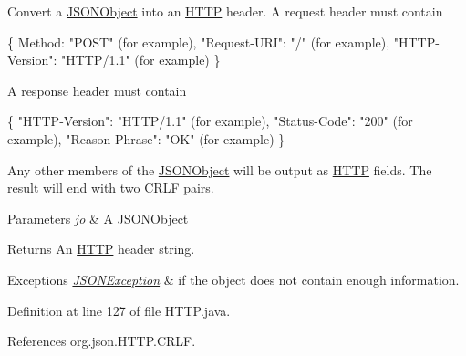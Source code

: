 Convert a \hyperlink{classorg_1_1json_1_1_j_s_o_n_object}{J\-S\-O\-N\-Object} into an \hyperlink{classorg_1_1json_1_1_h_t_t_p}{H\-T\-T\-P} header. A request header must contain 
\begin{DoxyPre}\{
   Method: "POST" (for example),
   "Request-URI": "/" (for example),
   "HTTP-Version": "HTTP/1.1" (for example)
\}\end{DoxyPre}
 A response header must contain 
\begin{DoxyPre}\{
   "HTTP-Version": "HTTP/1.1" (for example),
   "Status-Code": "200" (for example),
   "Reason-Phrase": "OK" (for example)
\}\end{DoxyPre}
 Any other members of the \hyperlink{classorg_1_1json_1_1_j_s_o_n_object}{J\-S\-O\-N\-Object} will be output as \hyperlink{classorg_1_1json_1_1_h_t_t_p}{H\-T\-T\-P} fields. The result will end with two C\-R\-L\-F pairs. 
\begin{DoxyParams}{Parameters}
{\em jo} & A \hyperlink{classorg_1_1json_1_1_j_s_o_n_object}{J\-S\-O\-N\-Object} \\
\hline
\end{DoxyParams}
\begin{DoxyReturn}{Returns}
An \hyperlink{classorg_1_1json_1_1_h_t_t_p}{H\-T\-T\-P} header string. 
\end{DoxyReturn}

\begin{DoxyExceptions}{Exceptions}
{\em \hyperlink{classorg_1_1json_1_1_j_s_o_n_exception}{J\-S\-O\-N\-Exception}} & if the object does not contain enough information. \\
\hline
\end{DoxyExceptions}


Definition at line 127 of file H\-T\-T\-P.\-java.



References org.\-json.\-H\-T\-T\-P.\-C\-R\-L\-F.


